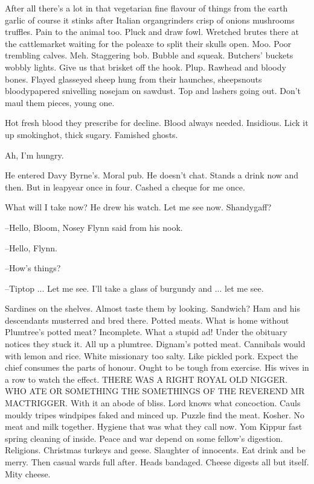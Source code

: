 After all there's a lot in that vegetarian fine flavour of things from the
earth garlic of course it stinks after Italian organgrinders crisp of
onions mushrooms truffles.
Pain to the animal too.
Pluck and draw fowl.
Wretched brutes there at the cattlemarket waiting for the poleaxe to split
their skulls open.
Moo.
Poor trembling calves.
Meh.
Staggering bob.
Bubble
and squeak.
Butchers' buckets wobbly lights.
Give us that brisket off the
hook.
Plup.
Rawhead and bloody bones.
Flayed glasseyed sheep hung from
their haunches,
sheepsnouts bloodypapered snivelling nosejam on sawdust.
Top and lashers going out.
Don't maul them pieces,
young one.

Hot fresh blood they prescribe for decline.
Blood always needed.
Insidious.
Lick it up smokinghot,
thick sugary.
Famished ghosts.

Ah,
I'm hungry.

He entered Davy Byrne's.
Moral pub.
He doesn't chat.
Stands a
drink now and then.
But in leapyear once in four.
Cashed a cheque for me
once.

What will I take now?
He drew his watch.
Let me see now.
Shandygaff?

--Hello,
Bloom,
Nosey Flynn said from his nook.

--Hello,
Flynn.

--How's things?

--Tiptop ...
Let me see.
I'll take a glass of burgundy and ...
let
me see.

Sardines on the shelves.
Almost taste them by looking.
Sandwich?
Ham and his descendants musterred and bred there.
Potted meats.
What is
home without Plumtree's potted meat?
Incomplete.
What a stupid ad!
Under the obituary notices they stuck it.
All up a plumtree.
Dignam's
potted meat.
Cannibals would with lemon and rice.
White missionary too
salty.
Like pickled pork.
Expect the chief consumes the parts of honour.
Ought to be tough from exercise.
His wives in a row to watch the effect.
THERE WAS A RIGHT ROYAL OLD NIGGER.
WHO ATE OR SOMETHING THE SOMETHINGS OF
THE REVEREND MR MACTRIGGER.
With it an abode of bliss.
Lord knows what
concoction.
Cauls mouldy tripes windpipes faked and minced up.
Puzzle
find the meat.
Kosher.
No meat and milk together.
Hygiene that was what
they call now.
Yom Kippur fast spring cleaning of inside.
Peace and war
depend on some fellow's digestion.
Religions.
Christmas turkeys and geese.
Slaughter of innocents.
Eat drink and be merry.
Then casual wards full
after.
Heads bandaged.
Cheese digests all but itself.
Mity cheese.

